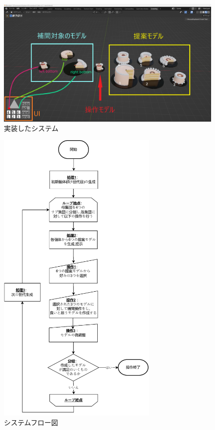 \begin{figure}[h]
    \centering
  \includegraphics[width=1.0\textwidth]{./imgs/system_ano.png}
  \caption{実装したシステム}\label{fig:systemAno}
\end{figure}

\clearpage
\begin{figure}[h]
    \centering
  \includegraphics[width=0.7\textwidth]{./imgs/systemFlow.pdf}
  \caption{システムフロー図}\label{fig:systemFlow}
\end{figure}
\clearpage


